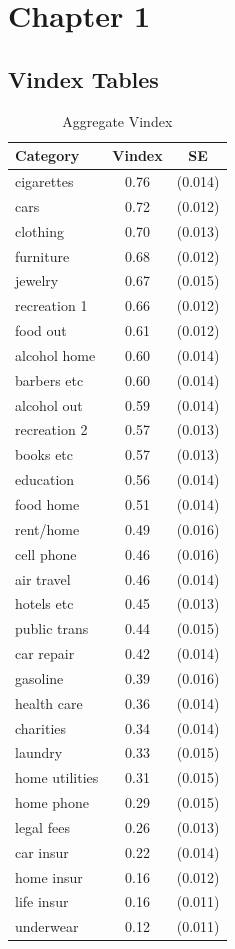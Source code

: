 \chapter{Chapter 1}
\label{sec:ap1}

\section{Vindex Tables}
\label{sec:vin_tables}

\begin{table}[!ht]
    \centering
\begin{tabular}{lcc}
	\hline
	Category & Vindex & SE \\
	\hline \hline
cigarettes       & 0.76 & (0.014) \\
cars             & 0.72 & (0.012) \\
clothing         & 0.70 & (0.013) \\
furniture        & 0.68 & (0.012) \\
jewelry          & 0.67 & (0.015) \\
recreation 1     & 0.66 & (0.012) \\
food out         & 0.61 & (0.012) \\
alcohol home     & 0.60 & (0.014) \\
barbers etc      & 0.60 & (0.014) \\
alcohol out      & 0.59 & (0.014) \\
recreation 2     & 0.57 & (0.013) \\
books etc        & 0.57 & (0.013) \\
education        & 0.56 & (0.014) \\
food home        & 0.51 & (0.014) \\
rent/home        & 0.49 & (0.016) \\
cell phone       & 0.46 & (0.016) \\
air travel       & 0.46 & (0.014) \\
hotels etc       & 0.45 & (0.013) \\
public trans     & 0.44 & (0.015) \\
car repair       & 0.42 & (0.014) \\
gasoline         & 0.39 & (0.016) \\
health care      & 0.36 & (0.014) \\
charities        & 0.34 & (0.014) \\
laundry          & 0.33 & (0.015) \\
home utilities   & 0.31 & (0.015) \\
home phone       & 0.29 & (0.015) \\
legal fees       & 0.26 & (0.013) \\
car insur        & 0.22 & (0.014) \\
home insur       & 0.16 & (0.012) \\
life insur       & 0.16 & (0.011) \\
underwear        & 0.12 & (0.011) \\
\hline
\end{tabular}
\caption{Aggregate Vindex}
\label{tab:vintab}
\vspace{-2in}
\end{table}

